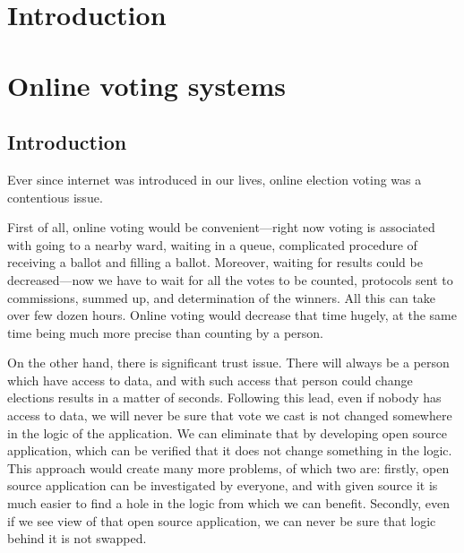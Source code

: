 \documentclass[a4paper,twoside,12pt]{book}
\newcounter{PagesWithoutNumbers}
\begin{document}
\vfill
 
 

\cleardoublepage


\pagestyle{onlyPageNumbers}
\tableofcontents

\setcounter{PagesWithoutNumbers}{\value{page}}
\mainmatter
\pagestyle{PageNumbersChapterTitles}



\chapter{Introduction}



\chapter{Online voting systems}

\section{Introduction}

	Ever since internet was introduced in our lives, online election voting was a contentious issue.

	First of all, online voting would be convenient---right now voting is associated with going to a nearby ward, waiting in a queue, 
	complicated procedure of receiving a ballot and filling a ballot.
	Moreover, waiting for results could be decreased---now we have to wait for all the votes to be counted, protocols sent to commissions,
	summed up, and determination of the winners. All this can take over few dozen hours.
	Online voting would decrease that time hugely, at the same time being much more precise than counting by a person.
	
	On the other hand, there is significant trust issue. There will always be a person which have access to data, 
	and with such access that person could change elections results in a matter of seconds.
	Following this lead, even if nobody has access to data, we will never be sure that vote we cast is not changed somewhere in the logic of the application.
	We can eliminate that by developing open source application, which can be verified that it does not change something in the logic.
	This approach would create many more problems, of which two are: firstly, open source application can be investigated by everyone, 
	and with given source it is much easier to find a hole in the logic from which we can benefit.
	Secondly, even if we see view of that open source application, we can never be sure that logic behind it is not swapped.
	
\end{document}
